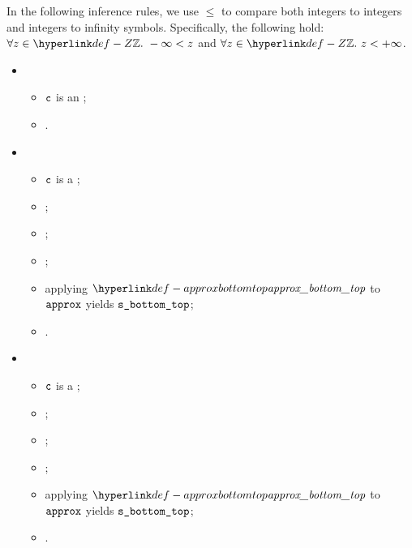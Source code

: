 In the following inference rules, we use $\leq$ to compare both integers to integers
and integers to infinity symbols. Specifically, the following hold:
$\forall z\in\Z.\ -\infty < z$ and $\forall z\in\Z.\ z < +\infty$.

\ProseParagraph
\OneApplies
\begin{itemize}
  \item {}
  \begin{itemize}
    \item $\texttt{c}$ is an \Proseexactconstraint{\ve};
    \item \Proseapproxexpr{$\tenv$}{$\vapprox$}{$\ve$}{$\vs$}.
  \end{itemize}

  \item {}
  \begin{itemize}
    \item $\texttt{c}$ is a \Proserangeconstraint{\veone}{\vetwo};
    \item \Proseapproxexprmin{$\tenv$}{$\veone$}{$\vzone$};
    \item \Proseapproxexprmax{$\tenv$}{$\vetwo$}{$\vztwo$};
    \item {};
    \item applying $\approxbottomtop$ to $\vapprox$ yields $\texttt{s\_bottom\_top}$;
    \item {}.
  \end{itemize}

  \item {}
  \begin{itemize}
    \item $\texttt{c}$ is a \Proserangeconstraint{\veone}{\vetwo};
    \item \Proseapproxexprmax{$\tenv$}{$\veone$}{$\vzone$};
    \item \Proseapproxexprmin{$\tenv$}{$\vetwo$}{$\vztwo$};
    \item {};
    \item applying $\approxbottomtop$ to $\vapprox$ yields $\texttt{s\_bottom\_top}$;
    \item {}.
  \end{itemize}
\end{itemize}

